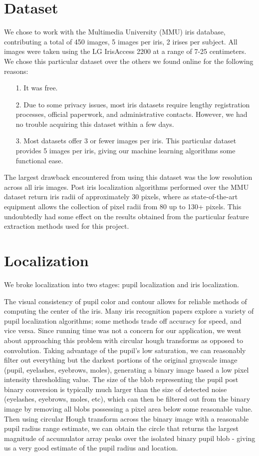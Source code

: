 \documentclass[12pt]{article}
\begin{document}
\section{Dataset}
We chose to work with the Multimedia University (MMU) iris database, contributing a total of 450 images, 5 images per iris, 2 irises per subject. All images were taken using the LG IrisAccess 2200 at a range of 7-25 centimeters. We chose this particular dataset over the others we found online for the following reasons:
\begin{itemize}
\item[1.] It was free.
\item[2.] Due to some privacy issues, most iris datasets require lengthy registration processes, official paperwork, and administrative contacts. However, we had no trouble acquiring this dataset within a few days.
\item[3.] Most datasets offer 3 or fewer images per iris. This particular dataset provides 5 images per iris, giving our machine learning algorithms some functional ease.
\end{itemize}

The largest drawback encountered from using this dataset was the low resolution across all iris images. Post iris localization algorithms performed over the MMU dataset return iris radii of approximately 30 pixels, where as state-of-the-art equipment allows the collection of pixel radii from 80 up to 130+ pixels. This undoubtedly had some effect on the results obtained from the particular feature extraction methods used for this project. 

\section{Localization}
\label{sec:local}
We broke localization into two stages: pupil localization and iris localization.

The visual consistency of pupil color and contour allows for reliable methods of computing the center of the iris. Many iris recognition papers explore a variety of pupil localization algorithms; some methods trade off accuracy for speed, and vice versa. Since running time was not a concern for our application, we went about approaching this problem with circular hough transforms as opposed to convolution. Taking advantage of the pupil's low saturation, we can reasonably filter out everything but the darkest portions of the original grayscale image (pupil, eyelashes, eyebrows, moles), generating a binary image based a low pixel intensity thresholding value. The size of the blob representing the pupil post binary conversion is typically much larger than the size of detected noise (eyelashes, eyebrows, moles, etc), which can then be filtered out from the binary image by removing all blobs possessing a pixel area below some reasonable value. Then using circular Hough transform across the binary image with a reasonable pupil radius range estimate, we can obtain the circle that returns the largest magnitude of accumulator array peaks over the isolated binary pupil blob - giving us a very good estimate of the pupil radius and location.
\end{document}
